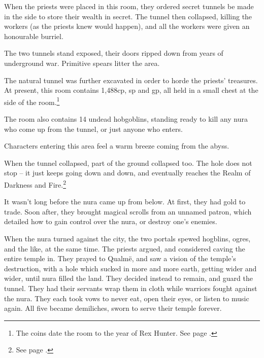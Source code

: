 \begin{multicols}{2}

\begin{exampletext}

When the priests were placed in this room, they ordered secret tunnels be made in the side to store their wealth in secret.
The tunnel then collapsed, killing the workers (as the priests knew would happen), and all the workers were given an honourable burriel.

\end{exampletext}

The two tunnels stand exposed, their doors ripped down from years of underground war.  Primitive spears litter the area.


The natural tunnel was further excavated in order to horde the priests' treasures.
At present, this room contains 1,488cp, \thepage sp and  gp, all held in a small chest at the side of the room.\footnote{The coins date the room to the year of Rex Hunter.
See page \pageref{r_hunter}.}

The room also contains 14 undead hobgoblins, standing ready to kill any nura who come up from the tunnel, or just anyone who enters.


\undeadhobgoblin


Characters entering this area feel a warm breeze coming from the abyss.

\begin{exampletext}

When the tunnel collapsed, part of the ground collapsed too.  The hole does not stop -- it just keeps going down and down, and eventually reaches the Realm of Darkness and Fire.\footnote{See page \pageref{darknessandfire}.}

It wasn't long before the nura came up from below.  At first, they had gold to trade.  Soon after, they brought magical scrolls from an unnamed patron, which detailed how to gain control over the nura, or destroy one's enemies.

When the nura turned against the city, the two portals spewed hogblins, ogres, and the like, at the same time.
The priests argued, and considered caving the entire temple in.
They prayed to Qualm\"{e}, and saw a vision of the temple's destruction, with a hole which sucked in more and more earth, getting wider and wider, until nura filled the land.
They decided instead to remain, and guard the tunnel.
They had their servants wrap them in cloth while warriors fought against the nura.
They each took vows to never eat, open their eyes, or listen to music again.
All five became demiliches, sworn to serve their temple forever.


\end{exampletext}
\end{multicols}
